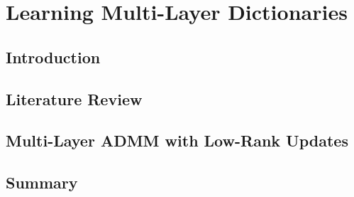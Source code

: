 \chapter{Learning Multi-Layer Dictionaries}
\section{Introduction}
\section{Literature Review}
\section{Multi-Layer ADMM with Low-Rank Updates}
\section{Summary}
